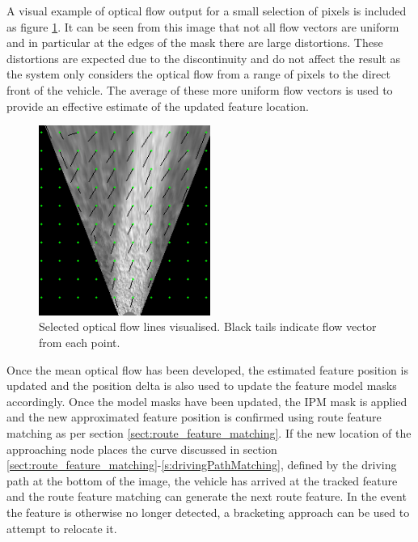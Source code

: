 \documentclass[]{aiaa-tc}%
\begin{document}
A visual example of optical flow output for a small selection of pixels is included as figure \ref{f:optical_flow_trails}. It can be seen from this image that not all flow vectors are uniform and in particular at the edges of the mask there are large distortions. These distortions are expected due to the discontinuity and do not affect the result as the system only considers the optical flow from a range of pixels to the direct front of the vehicle. The average of these more uniform flow vectors is used to provide an effective estimate of the updated feature location.


\begin{figure} %
	\centering
	\includegraphics[width=0.5\textwidth]{FeatureTracking/optical_flow_trails.png}
	\caption{Selected optical flow lines visualised. Black tails indicate flow vector from each point.}
	\label{f:optical_flow_trails}
\end{figure}

Once the mean optical flow has been developed, the estimated feature position is updated and the position delta is also used to update the feature model masks accordingly. Once the model masks have been updated, the IPM mask is applied and the new approximated feature position is confirmed using route feature matching as per section \ref{sect:route_feature_matching}. If the new location of the approaching node places the curve discussed in section \ref{sect:route_feature_matching}-\ref{s:drivingPathMatching}, defined by the driving path at the bottom of the image, the vehicle has arrived at the tracked feature and the route feature matching can generate the next route feature. In the event the feature is otherwise no longer detected, a bracketing approach can be used to attempt to relocate it.
\end{document}
